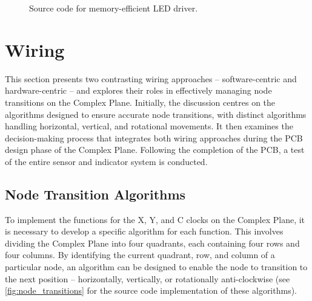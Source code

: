 \documentclass[12pt]{article}
\numberwithin{subsubsubsection}{subsubsection}
\begin{document}
\begin{figure}[H]
    \centering
    \caption{Source code for memory-efficient  LED driver.}
    \label{fig:memory}
\end{figure}
















\newpage
\section{Wiring}
\label{wiring}
This section presents two contrasting wiring approaches – software-centric and hardware-centric – and explores their roles in effectively managing node transitions on the Complex Plane. Initially, the discussion centres on the algorithms designed to ensure accurate node transitions, with distinct algorithms handling horizontal, vertical, and rotational movements. It then examines the decision-making process that integrates both wiring approaches during the PCB design phase of the Complex Plane. Following the completion of the PCB, a test of the entire sensor and indicator system is conducted.

\subsection{Node Transition Algorithms}

To implement the functions for the X, Y, and C clocks on the Complex Plane, it is necessary to develop a specific algorithm for each function. This involves dividing the Complex Plane into four quadrants, each containing four rows and four columns. By identifying the current quadrant, row, and column of a particular node, an algorithm can be designed to enable the node to transition to the next position – horizontally, vertically, or rotationally anti-clockwise (see \autoref{fig:node_transitions} for the source code implementation of these algorithms).  
\end{document}
